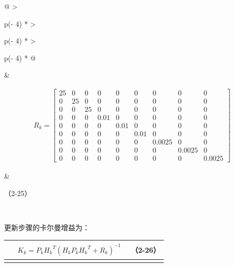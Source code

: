 {\def\LTcaptype{none} %
\begin{longtable}[]{@{}
  >{\raggedright\arraybackslash}p{}
  >{\raggedright\arraybackslash}p{}
  >{\raggedright\arraybackslash}p{}@{}}
\toprule\noalign{}
\begin{minipage}[b]{\linewidth}\centering
\end{minipage} & \begin{minipage}[b]{\linewidth}\centering
\[\begin{array}{r}
R_{k} = \begin{bmatrix}
25 & 0 & 0 & 0 & 0 & 0 & 0 & 0 & 0 \\
0 & 25 & 0 & 0 & 0 & 0 & 0 & 0 & 0 \\
0 & 0 & 25 & 0 & 0 & 0 & 0 & 0 & 0 \\
0 & 0 & 0 & 0.01 & 0 & 0 & 0 & 0 & 0 \\
0 & 0 & 0 & 0 & 0.01 & 0 & 0 & 0 & 0 \\
0 & 0 & 0 & 0 & 0 & 0.01 & 0 & 0 & 0 \\
0 & 0 & 0 & 0 & 0 & 0 & 0.0025 & 0 & 0 \\
0 & 0 & 0 & 0 & 0 & 0 & 0 & 0.0025 & 0 \\
0 & 0 & 0 & 0 & 0 & 0 & 0 & 0 & 0.0025
\end{bmatrix}
\end{array}\]
\end{minipage} & \begin{minipage}[b]{\linewidth}\raggedleft
（2-25）
\end{minipage} \\
\midrule\noalign{}
\endhead
\bottomrule\noalign{}
\endlastfoot
\end{longtable}
}

更新步骤的卡尔曼增益为：

{\def\LTcaptype{none} %
\begin{longtable}[]{@{}
  >{\raggedright\arraybackslash}p{}
  >{\raggedright\arraybackslash}p{}
  >{\raggedright\arraybackslash}p{}@{}}
\toprule\noalign{}
\begin{minipage}[b]{\linewidth}\centering
\end{minipage} & \begin{minipage}[b]{\linewidth}\centering
\[\begin{array}{r}
K_{k} = P_{k}{H_{k}}^{T}\left( H_{k}P_{k}{H_{k}}^{T} + R_{k} \right)^{- 1}
\end{array}\]
\end{minipage} & \begin{minipage}[b]{\linewidth}\raggedleft
（2-26）
\end{minipage} \\
\midrule\noalign{}
\endhead
\bottomrule\noalign{}
\endlastfoot
\end{longtable}
}

